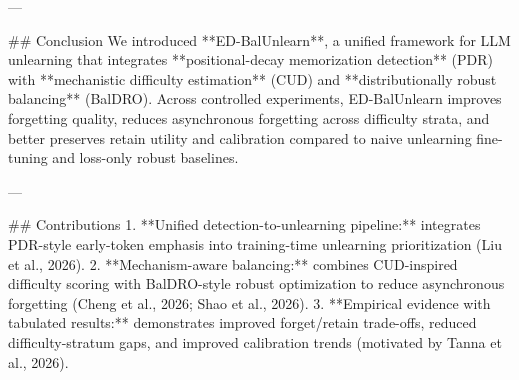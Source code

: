 ---

## Conclusion  
We introduced **ED-BalUnlearn**, a unified framework for LLM unlearning that integrates **positional-decay memorization detection** (PDR) with **mechanistic difficulty estimation** (CUD) and **distributionally robust balancing** (BalDRO). Across controlled experiments, ED-BalUnlearn improves forgetting quality, reduces asynchronous forgetting across difficulty strata, and better preserves retain utility and calibration compared to naive unlearning fine-tuning and loss-only robust baselines.

---

## Contributions  
1. **Unified detection-to-unlearning pipeline:** integrates PDR-style early-token emphasis into training-time unlearning prioritization (Liu et al., 2026).  
2. **Mechanism-aware balancing:** combines CUD-inspired difficulty scoring with BalDRO-style robust optimization to reduce asynchronous forgetting (Cheng et al., 2026; Shao et al., 2026).  
3. **Empirical evidence with tabulated results:** demonstrates improved forget/retain trade-offs, reduced difficulty-stratum gaps, and improved calibration trends (motivated by Tanna et al., 2026).